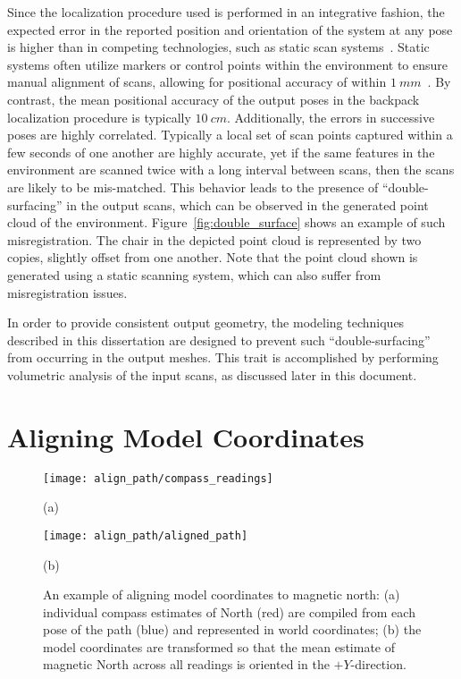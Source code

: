 \documentclass[12pt,onecolumn,oneside]{book}
\begin{document}
Since the localization procedure used is performed in an integrative fashion, the expected error in the reported position and orientation of the system at any pose is higher than in competing technologies, such as static scan systems~\cite{NickJournal}.  Static systems often utilize markers or control points within the environment to ensure manual alignment of scans, allowing for positional accuracy of within $1~mm$~\cite{Li97,Karimi00}.  By contrast, the mean positional accuracy of the output poses in the backpack localization procedure is typically $10~cm$.  Additionally, the errors in successive poses are highly correlated.  Typically a local set of scan points captured within a few seconds of one another are highly accurate, yet if the same features in the environment are scanned twice with a long interval between scans, then the scans are likely to be mis-matched.  This behavior leads to the presence of ``double-surfacing'' in the output scans, which can be observed in the generated point cloud of the environment.  Figure~\ref{fig:double_surface} shows an example of such misregistration.  The chair in the depicted point cloud is represented by two copies, slightly offset from one another.  Note that the point cloud shown is generated using a static scanning system, which can also suffer from misregistration issues.

In order to provide consistent output geometry, the modeling techniques described in this dissertation are designed to prevent such ``double-surfacing'' from occurring in the output meshes.  This trait is accomplished by performing volumetric analysis of the input scans, as discussed later in this document. 

\section{Aligning Model Coordinates}
\label{sec:align_path}

\begin{figure}
	\begin{minipage}[t]{0.5\linewidth}
		\centerline{\texttt{[image: align\_path/compass\_readings]}}
		\centerline{(a)}
	\end{minipage}
	\hfill
	\begin{minipage}[t]{0.5\linewidth}
		\centerline{\texttt{[image: align\_path/aligned\_path]}}
		\centerline{(b)}
	\end{minipage}

	\caption[Aligning model coordinate system with North.]{An example of aligning model coordinates to magnetic north:  (a) individual compass estimates of North (red) are compiled from each pose of the path (blue) and represented in world coordinates; (b) the model coordinates are transformed so that the mean estimate of magnetic North across all readings is oriented in the $+Y$-direction.}
	\label{fig:align_path}
\end{figure}
\end{document}
